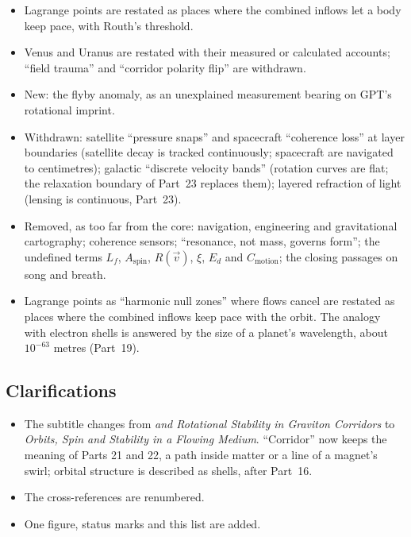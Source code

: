 \documentclass[11pt,a4paper]{article}
\begin{document}
\begin{itemize}
\item Lagrange points are restated as places where the combined inflows let a body keep pace, with Routh's threshold.
\item Venus and Uranus are restated with their measured or calculated accounts; ``field trauma'' and ``corridor polarity flip'' are withdrawn.
\item New: the flyby anomaly, as an unexplained measurement bearing on GPT's rotational imprint.
\item Withdrawn: satellite ``pressure snaps'' and spacecraft ``coherence loss'' at layer boundaries (satellite decay is tracked continuously; spacecraft are navigated to centimetres); galactic ``discrete velocity bands'' (rotation curves are flat; the relaxation boundary of Part~23 replaces them); layered refraction of light (lensing is continuous, Part~23).
\item Removed, as too far from the core: navigation, engineering and gravitational cartography; coherence sensors; ``resonance, not mass, governs form''; the undefined terms $L_f$, $A_{\text{spin}}$, $R(\vec v)$, $\xi$, $E_d$ and $C_{\text{motion}}$; the closing passages on song and breath.
\item Lagrange points as ``harmonic null zones'' where flows cancel are restated as places where the combined inflows keep pace with the orbit. The analogy with electron shells is answered by the size of a planet's wavelength, about $10^{-63}$ metres (Part~19).
\end{itemize}

\subsection*{Clarifications}
\begin{itemize}
\item The subtitle changes from \emph{and Rotational Stability in Graviton Corridors} to \emph{Orbits, Spin and Stability in a Flowing Medium}. ``Corridor'' now keeps the meaning of Parts 21 and 22, a path inside matter or a line of a magnet's swirl; orbital structure is described as shells, after Part~16.
\item The cross-references are renumbered.
\item One figure, status marks and this list are added.
\end{itemize}

\newpage


\end{document}

